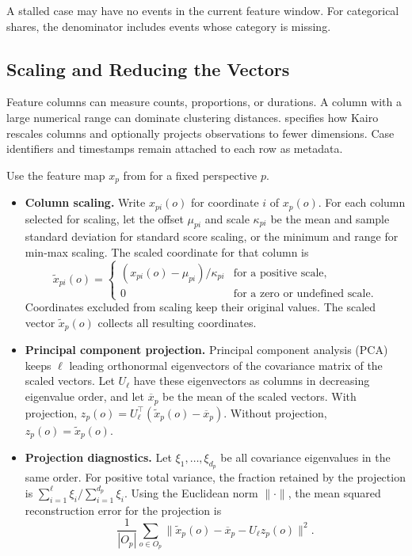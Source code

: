 A stalled case may have no events in the current feature window. For categorical shares, the denominator includes events whose category is missing.



\subsection{Scaling and Reducing the Vectors}\label{sec:approach-reduction}

Feature columns can measure counts, proportions, or durations. A column with a large numerical range can dominate clustering distances.  specifies how Kairo rescales columns and optionally projects observations to fewer dimensions. Case identifiers and timestamps remain attached to each row as metadata.

\begin{Definition}\label{def:cluster-representation}
Use the feature map $x_p$ from  for a fixed perspective $p$.
\begin{itemize}
  \item \textbf{Column scaling.} Write $x_{pi}(o)$ for coordinate $i$ of $x_p(o)$. For each column selected for scaling, let the offset $\mu_{pi}$ and scale $\kappa_{pi}$ be the mean and sample standard deviation for standard score scaling, or the minimum and range for min-max scaling. The scaled coordinate for that column is
  \[
    \widetilde{x}_{pi}(o)=
    \begin{cases}
      (x_{pi}(o)-\mu_{pi})/\kappa_{pi} & \text{for a positive scale},\\
      0 & \text{for a zero or undefined scale}.
    \end{cases}
  \]
  Coordinates excluded from scaling keep their original values. The scaled vector $\widetilde{x}_p(o)$ collects all resulting coordinates.
  \item \textbf{Principal component projection.} Principal component analysis (PCA) keeps $\ell$ leading orthonormal eigenvectors of the covariance matrix of the scaled vectors. Let $U_\ell$ have these eigenvectors as columns in decreasing eigenvalue order, and let $\overline{x}_p$ be the mean of the scaled vectors. With projection, $z_p(o)=U_\ell^\top(\widetilde{x}_p(o)-\overline{x}_p)$. Without projection, $z_p(o)=\widetilde{x}_p(o)$.
  \item \textbf{Projection diagnostics.} Let $\xi_1,\ldots,\xi_{d_p}$ be all covariance eigenvalues in the same order. For positive total variance, the fraction retained by the projection is $\sum_{i=1}^{\ell}\xi_i/\sum_{i=1}^{d_p}\xi_i$. Using the Euclidean norm $\|\cdot\|$, the mean squared reconstruction error for the projection is
  \[
     \frac{1}{|O_p|}\sum_{o\in O_p}
       \bigl\|\widetilde{x}_p(o)-\overline{x}_p-U_\ell z_p(o)\bigr\|^2.
  \]
\end{itemize}
\end{Definition}

